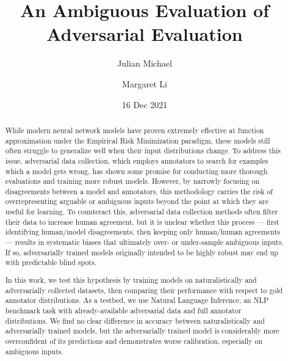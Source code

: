 \documentclass[10pt,a4paper]{article}
\title{An Ambiguous Evaluation of Adversarial Evaluation}
\author{Julian Michael}
\author{Margaret Li}
\affil{CSE 599: Empirical Foundations of Machine Learning \\
Paul G. Allen School of Computer Science \& Engineering, University of Washington \texttt{\{julianjm,margsli\}@cs.washington.edu}}
\date{16 Dec 2021}
\begin{document}
\maketitle

\begin{abstract}
  While modern neural network models have proven extremely effective at function approximation under the Empirical Risk Minimization paradigm, these models still often struggle to generalize well when their input distributions change.
  To address this issue, 
  adversarial data collection, which employs annotators to search for examples which a model gets wrong, has shown some promise for conducting more thorough evaluations and training more robust models.  
  However, by narrowly focusing on disagreements between a model and annotators, this methodology carries the risk of overrepresenting arguable or ambiguous inputs beyond the point at which they are useful for learning. To counteract this, adversarial data collection methods often filter their data to increase human agreement, but it is unclear whether this
  process --- first identifying human/model disagreements, then keeping only human/human
  agreements --- results in systematic biases that ultimately over- or under-sample ambiguous
  inputs. If so, adversarially trained models originally intended to be highly robust may end up
  with predictable blind spots.

  In this work, we test this hypothesis by training models on naturalistically and adversarially
  collected datasets, then comparing their performance with respect to gold annotator distributions.
  As a testbed, we use Natural Language Inference, an NLP benchmark task with already-available
  adversarial data and full annotator distributions. We find no clear difference in accuracy
  between naturalistically and adversarially trained models, but the adversarially trained model is
  considerably more overconfident of its predictions and demonstrates worse calibration, especially
  on ambiguous inputs.
\end{abstract}
\end{document}

